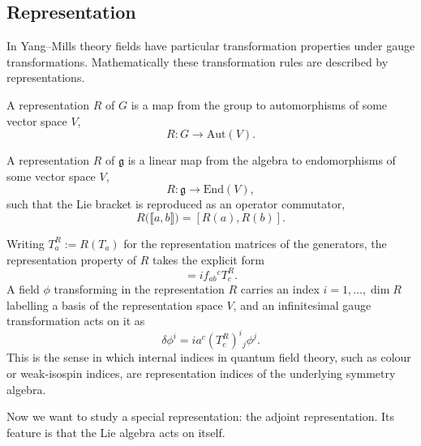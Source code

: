 \subsection{Representation}

In Yang--Mills theory fields have particular transformation
properties under gauge transformations. Mathematically these
transformation rules are described by representations.

\begin{definition}
A representation $R$ of $G$ is a map from the group to automorphisms
of some vector space $V$,
\begin{equation}
    R : G \to \mathrm{Aut}(V).
\end{equation}
\end{definition}

\begin{definition}
A representation $R$ of $\mathfrak g$ is a linear map from the
algebra to endomorphisms of some vector space $V$,
\begin{equation}
    R : \mathfrak{g} \to \mathrm{End}(V),
\end{equation}
such that the Lie bracket is reproduced as an operator commutator,
\begin{equation}
    R\big(\llbracket a,b \rrbracket\big) = [R(a), R(b)].
\end{equation}
\end{definition}

Writing $T_a^R := R(T_a)$ for the representation matrices of the
generators, the representation property of $R$ takes the explicit form
\begin{equation}
[T_a^R, T_b^R] = i f_{ab}{}^{c} T_c^R .
\end{equation}
A field $\phi$ transforming in the representation $R$ carries an
index $i = 1, \dots, \dim R$ labelling a basis of the representation
space $V$, and an infinitesimal gauge transformation acts on it as
\begin{equation}
\delta \phi^i = i a^c (T_c^R)^i{}_j \phi^j .
\end{equation}
This is the sense in which internal indices in quantum field theory,
such as colour or weak-isospin indices, are representation indices of
the underlying symmetry algebra.

Now we want to study a special representation: the adjoint representation. Its feature is that the Lie algebra acts on itself.

